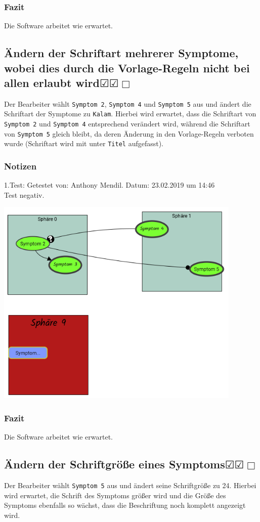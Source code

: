 \documentclass{scrartcl}
\newcommand{\subsectiont}[2]{\subsection[#1]{#1{\normalsize\normalfont #2}}}
\newcommand{\leer}{$\Box$}
\newcommand{\ok}{$\CheckedBox$}
\begin{document}
\subsubsection{Fazit}
Die Software arbeitet wie erwartet.

\subsectiont{Ändern der Schriftart mehrerer Symptome, wobei dies durch die Vorlage-Regeln nicht bei allen erlaubt wird}{\dotfill\ok\ok\leer}
Der Bearbeiter wählt \texttt{Symptom 2}, \texttt{Symptom 4} und \texttt{Symptom 5} aus und ändert die Schriftart der Symptome zu \texttt{Kalam}. Hierbei wird erwartet, dass die Schriftart von  \texttt{Symptom 2} und \texttt{Symptom 4} entsprechend verändert wird, während die Schriftart von \texttt{Symptom 5} gleich bleibt, da deren Änderung in den Vorlage-Regeln verboten wurde (Schriftart wird mit unter \texttt{Titel} aufgefasst).  
\subsubsection{Notizen}
1.Test: Getestet von: Anthony Mendil. Datum: 23.02.2019 um 14:46 \\
Test negativ.
\begin{center}
\includegraphics[height=10cm]{2_29.PNG}
\end{center}
\subsubsection{Fazit}
Die Software arbeitet wie erwartet.

\subsectiont{Ändern der Schriftgröße eines Symptoms}{\dotfill\ok\ok\leer}
Der Bearbeiter wählt \texttt{Symptom 5} aus und ändert seine Schriftgröße zu 24. Hierbei wird erwartet, die Schrift des Symptoms größer wird und die Größe des Symptoms ebenfalls so wächst, dass die Beschriftung noch komplett angezeigt wird. 
\end{document}
